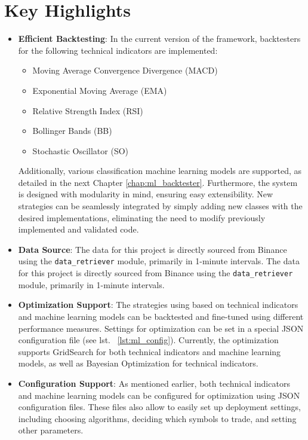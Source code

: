 \section{Key Highlights}

\begin{itemize}
    \item \textbf{Efficient Backtesting}: In the current version of the framework, backtesters for the following technical indicators are implemented:
\begin{itemize}
    \item Moving Average Convergence Divergence (MACD)
    \item Exponential Moving Average (EMA)
    \item Relative Strength Index (RSI)
    \item Bollinger Bands (BB)
    \item Stochastic Oscillator (SO)
\end{itemize}
Additionally, various classification machine learning models are supported, as detailed in the next Chapter \ref{chap:ml_backtester}.
Furthermore, the system is designed with modularity in mind, ensuring easy extensibility.
New strategies can be seamlessly integrated by simply adding new classes with the desired implementations, eliminating the need to modify previously implemented and validated code.
    \item \textbf{Data Source}: The data for this project is directly sourced from Binance using the \texttt{data\_retriever} module, primarily in 1-minute intervals.
The data for this project is directly sourced from Binance using the \texttt{data\_retriever} module, primarily in 1-minute intervals.

    \item \textbf{Optimization Support}: The strategies using based on technical indicators and machine learning models can be backtested and fine-tuned using different performance measures. Settings for optimization can be set in a special JSON configuration file (see lst. ~\ref{lst:ml_config}).
Currently, the optimization supports GridSearch for both technical indicators and machine learning models, as well as Bayesian Optimization
for technical indicators.

    \item \textbf{Configuration Support}: As mentioned earlier, both technical indicators and machine learning models can be configured for optimization using JSON configuration files. These files also allow to easily set up deployment settings, including choosing algorithms, deciding which symbols to trade, and setting other parameters.


\end{itemize}
